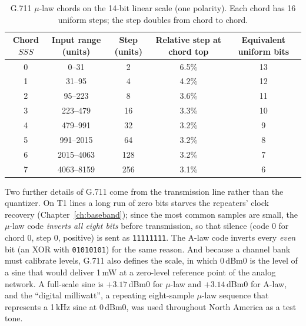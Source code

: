 \begin{table}[htbp]\centering\small
\caption{G.711 $\mu$-law chords on the 14-bit linear scale (one polarity). Each chord has 16
uniform steps; the step doubles from chord to chord.}
\label{tab:ch05:mulaw}
\begin{tabular}{@{}c c c c c@{}}
\toprule
Chord $SSS$ & Input range (units) & Step (units) & Relative step at chord top & Equivalent uniform bits\\
\midrule
0 & 0--31 & 2 & 6.5\% & 13 \\
1 & 31--95 & 4 & 4.2\% & 12 \\
2 & 95--223 & 8 & 3.6\% & 11 \\
3 & 223--479 & 16 & 3.3\% & 10 \\
4 & 479--991 & 32 & 3.2\% & 9 \\
5 & 991--2015 & 64 & 3.2\% & 8 \\
6 & 2015--4063 & 128 & 3.2\% & 7 \\
7 & 4063--8159 & 256 & 3.1\% & 6 \\
\bottomrule
\end{tabular}
\end{table}

Two further details of G.711 come from the transmission line rather than the quantizer. On T1
lines a long run of zero bits starves the repeaters' clock recovery
(Chapter~\ref{ch:baseband}); since the most common samples are small, the $\mu$-law code
\emph{inverts all eight bits} before transmission, so that silence (code 0 for chord 0, step 0,
positive) is sent as \texttt{11111111}. The A-law code inverts every \emph{even} bit (an XOR with
\texttt{01010101}) for the same reason. And because a channel bank must calibrate levels,
G.711 also defines the  scale, in which 0\,dBm0 is the level of a sine that would
deliver 1\,mW at a zero-level reference point of the analog network. A full-scale sine is
$+3.17$\,dBm0 for $\mu$-law and $+3.14$\,dBm0 for A-law, and the ``digital milliwatt'', a
repeating eight-sample $\mu$-law sequence that represents a 1\,kHz sine at 0\,dBm0, was used
throughout North America as a test tone.



